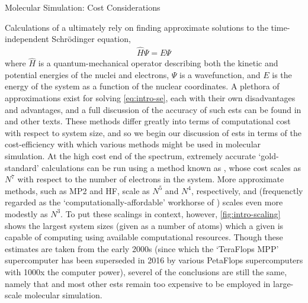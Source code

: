 \begin{section}{Molecular Simulation: Cost Considerations}

Calculations of a \pes ultimately rely on finding approximate solutions to
the time-independent Schr\"odinger equation,
\begin{align}
\label{eq:intro-se}
\hat{H}\Psi = E\Psi
\end{align}
where $\hat{H}$ is a quantum-mechanical operator describing both the kinetic
and potential energies of the nuclei and electrons, $\Psi$ is a wavefunction,
and $E$ is the energy of the system as a function of the nuclear coordinates. A plethora of
approximations exist for solving \cref{eq:intro-se}, each with their own
disadvantages and advantages, and a full discussion of the accuracy of such
\glspl{est} can be found in \citet{Cramer2004} and other texts.
These methods differ greatly into terms of
computational cost with respect to system size, and so we begin our
discussion of \glspl{est} in terms of the cost-efficiency with which various
methods might be used in molecular simulation.
%
At the high cost end of the spectrum, extremely accurate `gold-standard' \est
calculations can be run using a method known as
\ccsdt, whose cost scales as $N^7$
with respect to the number of electrons in the system. More approximate
methods, such as
MP2 and HF, scale as $N^5$ and $N^4$, respectively, and \dft (frequenctly regarded
as the 
`computationally-affordable' workhorse of \est) scales even more modestly as $N^3$.
To put these scalings in context,
however,
\cref{fig:intro-scaling} shows the largest system sizes (given as a number of
atoms) which a given \est is capable of computing using available
computational resources. 
Though these estimates are taken from the early 2000s (since which
the `TeraFlops MPP' supercomputer has been superseded in 2016 by
various PetaFlops supercomputers with 1000x the computer power), severel of
the conclusions are still the same, namely that \ccsdt and most other
\glspl{est} remain too expensive to be employed in large-scale molecular
simulation.


\end{section}
